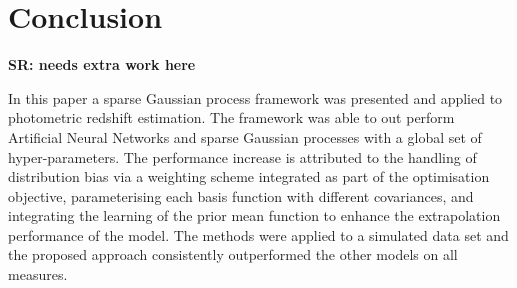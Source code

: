 \documentclass[useAMS,usenatbib,fleqn]{mn2e}
\begin{document}
\section{Conclusion}
\label{sec-conclusion}
\textbf{SR: needs extra work here}

In this paper a sparse Gaussian process framework was presented and applied to photometric redshift estimation. The framework was able to out perform Artificial Neural Networks and sparse Gaussian processes with a global set of hyper-parameters. The performance increase is attributed to the handling of distribution bias via a weighting scheme integrated as part of the optimisation objective, parameterising each basis function with different covariances, and integrating the learning of the prior mean function to enhance the extrapolation performance of the model. The methods were applied to a simulated data set and the proposed approach consistently outperformed the other models on all measures.

\footnotesize{


}

\label{lastpage}
\end{document}
